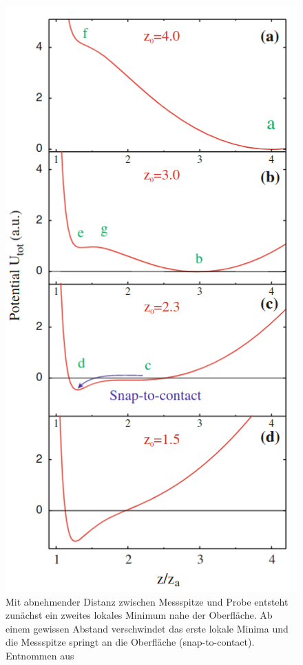           \begin{figure}
            \includegraphics[scale = 0.3]{pictures/pot_contact.png}
            \caption{Mit abnehmender Distanz zwischen Messspitze und Probe entsteht zunächst ein zweites lokales Minimum nahe der Oberfläche. Ab einem gewissen Abstand verschwindet das erste lokale Minima und die Messspitze springt an die Oberfläche (snap-to-contact). Entnommen aus \cite{voigtlander_scanning_2015}}
            \label{fig:pot_contact}
          \end{figure}

